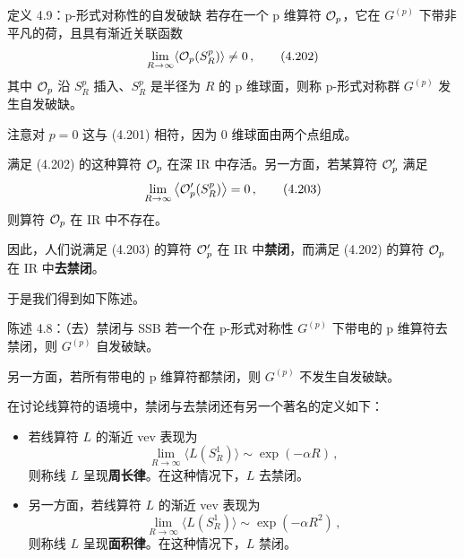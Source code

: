 \begin{definitionbox}{定义 4.9：p-形式对称性的自发破缺}
若存在一个 p 维算符 $\mathcal{O}_p$，它在 $G^{(p)}$ 下带非平凡的荷，且具有渐近关联函数
\begin{equation}
  \lim_{R\to\infty}\langle\mathcal{O}_p(S^p_R)\rangle\neq 0\,, \tag{4.202}
\end{equation}
其中 $\mathcal{O}_p$ 沿 $S^p_R$ 插入、$S^p_R$ 是半径为 $R$ 的 p 维球面，则称 p-形式对称群 $G^{(p)}$ 发生自发破缺。
\end{definitionbox}

注意对 $p=0$ 这与 (4.201) 相符，因为 0 维球面由两个点组成。


满足 (4.202) 的这种算符 $\mathcal{O}_p$ 在深 IR 中存活。另一方面，若某算符 $\mathcal{O}'_p$ 满足
\begin{equation}
  \lim_{R\to\infty}\left\langle\mathcal{O}'_p(S^p_R)\right\rangle=0\,, \tag{4.203}
\end{equation}
则算符 $\mathcal{O}_p$ 在 IR 中不存在。



因此，人们说满足 (4.203) 的算符 $\mathcal{O}'_p$ 在 IR 中\textbf{禁闭}，而满足 (4.202) 的算符 $\mathcal{O}_p$ 在 IR 中\textbf{去禁闭}。

于是我们得到如下陈述。

\begin{statementbox}{陈述 4.8：（去）禁闭与 SSB}
若一个在 p-形式对称性 $G^{(p)}$ 下带电的 p 维算符去禁闭，则 $G^{(p)}$ 自发破缺。

另一方面，若所有带电的 p 维算符都禁闭，则 $G^{(p)}$ 不发生自发破缺。
\end{statementbox}


在讨论线算符的语境中，禁闭与去禁闭还有另一个著名的定义如下：

\begin{itemize}[leftmargin=1.4em,itemsep=4pt,topsep=1pt]
\item 若线算符 $L$ 的渐近 vev 表现为
\begin{equation}
  \lim_{R\to\infty}\langle L(S^1_R)\rangle\sim\exp\left(-\alpha R\right)\,, \tag{4.204}
\end{equation}
则称线 $L$ 呈现\textbf{周长律}。在这种情况下，$L$ 去禁闭。
\item 另一方面，若线算符 $L$ 的渐近 vev 表现为
\begin{equation}
  \lim_{R\to\infty}\langle L(S^1_R)\rangle\sim\exp\left(-\alpha R^2\right)\,, \tag{4.205}
\end{equation}
则称线 $L$ 呈现\textbf{面积律}。在这种情况下，$L$ 禁闭。
\end{itemize}

